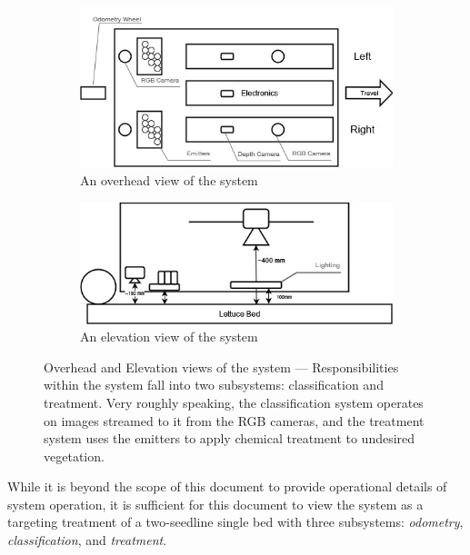 \documentclass[12pt]{article}
\begin{document}
\begin{figure}[H]
	\centering
	\begin{subfigure}[t]{.38\textwidth}
		\centering
		\includegraphics[width=1\linewidth]{./figures/physical-system-overhead.jpg}
		\caption{An overhead view of the system}
		\label{fig:system-overhead}
	\end{subfigure}
	\hspace{1em}%
	\begin{subfigure}[t]{.38\textwidth}
		\centering
		\includegraphics[width=1\linewidth]{./figures/physical-system-elevation.jpg}
		\caption{An elevation view of the system}
		\label{fig:system-elevation}
	\end{subfigure}
	\caption[Overhead and elevation views of the system]{Overhead and Elevation views of the system --- Responsibilities within the system fall into two subsystems: classification and treatment. Very roughly speaking, the classification system operates on images streamed to it from the RGB cameras, and the treatment system uses the emitters to apply chemical treatment to undesired vegetation.}
	\label{fig:system}
\end{figure}

While it is beyond the scope of this document to provide operational details of system operation, it is sufficient for this document to view the system as a targeting treatment of a two-seedline single bed with three subsystems: \textit{odometry}, \textit{classification}, and \textit{treatment}.   
\end{document}
